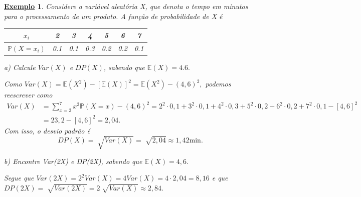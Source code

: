 \documentclass{article}
\newtheorem{example}{\underline{Exemplo}}
\begin{document}
 \newpage
\begin{example}
  Considere a variável aleatória X, que denota o tempo em minutos para o processamento de um produto. A função de probabilidade de X é 

 \begin{center}
  \begin{table}[h!]
  \centering
    \begin{tabular}{| c | c c c c c c |}
      \hline 
      \(x_{i}\) & 2 & 3 & 4 & 5 & 6 & 7\\
      \hline
      \(\mathbb{P}(X = x_{i})\) & 0.1 & 0.1 & 0.3 & 0.2 & 0.2 & 0.1\\
      \hline
    \end{tabular}
  \end{table}
\end{center}

 a) Calcule \(Var(X)\) e \(DP(X)\), sabendo que \(\mathbb{E}(X) = 4.6.\)

 Como \(Var(X) = \mathbb{E}(X^{2}) - [\mathbb{E}(X)]^{2} = \mathbb{E}(X^{2}) - (4,6)^{2},\) podemos reescrever como 
 \begin{align*}
   Var(X) &= \sum\limits_{x=2}^{7}x^{2}\mathbb{P}(X=x) - (4,6)^{2} = 2^{2}\cdot 0,1 + 3^{2}\cdot 0,1 + 4^{2}\cdot 0,3 + 5^{2}\cdot 0,2 + 6^{2}\cdot 0,2 + 7^{2}\cdot 0,1 - [4,6]^{2}\\
          &= 23,2 - [4,6]^{2} = 2,04.
 \end{align*}
 Com isso, o desvio padrão é 
   \[
     DP(X) = \sqrt[]{Var(X)} = \sqrt[]{2,04}\approx 1,42\text{min.}
   \]

 b) Encontre Var(2X) e DP(2X), sabendo que \(\mathbb{E}(X) = 4,6.\)

 Segue que \(Var(2X) = 2^{2}Var(X) = 4Var(X) = 4 \cdot 2,04 = 8,16\) e que \(DP(2X) = \sqrt[]{Var(2X)} = 2\sqrt[]{Var(X)}\approx 2,84.\)
\end{example}
\end{document}
